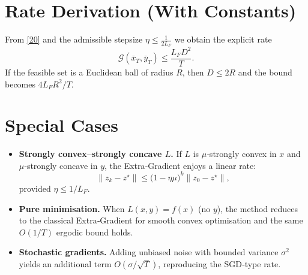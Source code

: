 \documentclass{article}
\newcommand{\gap}{\mathcal{G}}
\begin{document}
\section*{Rate Derivation (With Constants)}
From \eqref{20} and the admissible stepsize $\eta\le\frac{1}{2L_{F}}$ we obtain the explicit rate
\[
\gap(\bar x_{T},\bar y_{T})
\le \frac{L_{F}D^{2}}{T}.
\]
If the feasible set is a Euclidean ball of radius $R$, then $D\le 2R$ and the bound becomes $4L_{F}R^{2}/T$.

\section*{Special Cases}
\begin{itemize}[leftmargin=*]
\item \textbf{Strongly convex–strongly concave $L$.}  If $L$ is $\mu$‑strongly convex in $x$ and $\mu$‑strongly concave in $y$, the Extra‑Gradient enjoys a linear rate:
\[
\|z_{k}-z^{\star}\|\le\bigl(1-\eta\mu\bigr)^{k}\|z_{0}-z^{\star}\|,
\]
provided $\eta\le 1/L_{F}$.
\item \textbf{Pure minimisation.}  When $L(x,y)=f(x)$ (no $y$), the method reduces to the classical Extra‑Gradient for smooth convex optimisation and the same $O(1/T)$ ergodic bound holds.
\item \textbf{Stochastic gradients.}  Adding unbiased noise with bounded variance $\sigma^{2}$ yields an additional term $O(\sigma/\sqrt{T})$, reproducing the SGD‑type rate.
\end{itemize}
\end{document}
